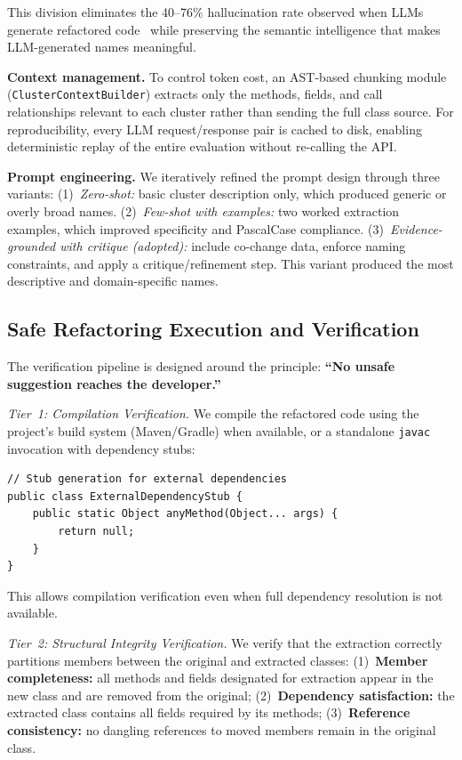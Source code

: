 \documentclass[sigconf]{acmart}
\begin{document}
This division eliminates the 40--76\% hallucination rate observed when LLMs
generate refactored code~\cite{cassee2024refuctoring, Liu2024Empirical} while
preserving the semantic intelligence that makes LLM-generated names meaningful.

\textbf{Context management.}  To control token cost, an AST-based chunking
module (\texttt{ClusterContextBuilder}) extracts only the methods, fields,
and call relationships relevant to each cluster rather than sending the full
class source. For reproducibility, every LLM request/response pair is cached
to disk, enabling deterministic replay of the entire evaluation without
re-calling the API.

\textbf{Prompt engineering.}  We iteratively refined the prompt design through
three variants: (1)~\emph{Zero-shot:} basic cluster description only, which
produced generic or overly broad names. (2)~\emph{Few-shot with examples:} two
worked extraction examples, which improved specificity and PascalCase compliance.
(3)~\emph{Evidence-grounded with critique (adopted):} include co-change data,
enforce naming constraints, and apply a critique/refinement step. This variant
produced the most descriptive and domain-specific names.

\subsection{Safe Refactoring Execution and Verification}
\label{sec:verification}

The verification pipeline is designed around the principle: \textbf{``No unsafe
suggestion reaches the developer.''}

\textit{Tier~1: Compilation Verification.}  We compile the refactored code using
the project's build system (Maven/Gradle) when available, or a standalone
\texttt{javac} invocation with dependency stubs:

\begin{lstlisting}[style=javacode]
// Stub generation for external dependencies
public class ExternalDependencyStub {
    public static Object anyMethod(Object... args) {
        return null;
    }
}
\end{lstlisting}

This allows compilation verification even when full dependency resolution is not
available.

\textit{Tier~2: Structural Integrity Verification.}  We verify that the
extraction correctly partitions members between the original and extracted
classes: (1)~\textbf{Member completeness:} all methods and fields designated for
extraction appear in the new class and are removed from the original;
(2)~\textbf{Dependency satisfaction:} the extracted class contains all fields
required by its methods; (3)~\textbf{Reference consistency:} no dangling
references to moved members remain in the original class.
\end{document}
